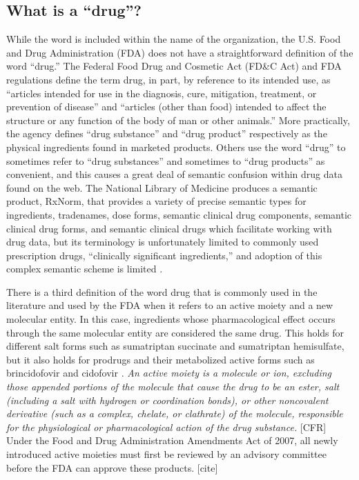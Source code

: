 \documentclass{bioinfo}
\begin{document}
\subsection{What is a ``drug''?}
While the word is included within the name of the organization, the U.S. Food and Drug Administration (FDA) does not have a straightforward definition of the word ``drug.'' The Federal Food Drug and Cosmetic Act (FD\&C Act) and FDA regulations define the term drug, in part, by reference to its intended use, as ``articles intended for use in the diagnosis, cure, mitigation, treatment, or prevention of disease” and “articles (other than food) intended to affect the structure or any function of the body of man or other animals.'' \citep{FDADrug}
More practically, the agency defines ``drug substance'' and ``drug product'' respectively as the physical ingredients found in marketed products. Others use the word ``drug'' to sometimes refer to ``drug substances'' and sometimes to ``drug products'' as convenient, and this causes a great deal of semantic confusion within drug data found on the web. The National Library of Medicine produces a semantic product, RxNorm, that provides a variety of precise semantic types for ingredients, tradenames, dose forms, semantic clinical drug components, semantic clinical drug forms, and semantic clinical drugs which facilitate working with drug data, but its terminology is unfortunately limited to commonly used prescription drugs, ``clinically significant ingredients,'' and adoption of this complex semantic scheme is limited \citep{RxNorm}.

There is a third definition of the word drug that is commonly used in the literature and used by the FDA when it refers to an active moiety and a new molecular entity. In this case, ingredients whose pharmacological effect occurs through the same molecular entity are considered the same drug. This holds for different salt forms such as sumatriptan succinate and sumatriptan hemisulfate, but it also holds for prodrugs and their metabolized active forms such as brincidofovir and cidofovir \citep{NME}. \emph{An active moiety is a molecule or ion, excluding those appended portions of the molecule that cause the drug to be an ester, salt (including a salt with hydrogen or coordination bonds), or other noncovalent derivative (such as a complex, chelate, or clathrate) of the molecule, responsible for the physiological or pharmacological action of the drug substance.} [CFR] Under the Food and Drug Administration Amendments Act of 2007, all newly introduced active moieties must first be reviewed by an advisory committee before the FDA can approve these products. [cite]
\end{document}

